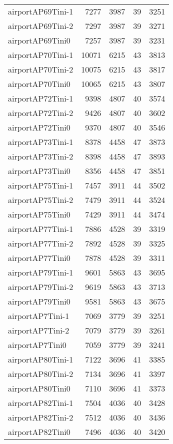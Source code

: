 \begin{longtable}{lrrrr}
airportAP69Tini-1 & 7277 & 3987 & 39 & 3251 \\
airportAP69Tini-2 & 7297 & 3987 & 39 & 3271 \\
airportAP69Tini0 & 7257 & 3987 & 39 & 3231 \\
airportAP70Tini-1 & 10071 & 6215 & 43 & 3813 \\
airportAP70Tini-2 & 10075 & 6215 & 43 & 3817 \\
airportAP70Tini0 & 10065 & 6215 & 43 & 3807 \\
airportAP72Tini-1 & 9398 & 4807 & 40 & 3574 \\
airportAP72Tini-2 & 9426 & 4807 & 40 & 3602 \\
airportAP72Tini0 & 9370 & 4807 & 40 & 3546 \\
airportAP73Tini-1 & 8378 & 4458 & 47 & 3873 \\
airportAP73Tini-2 & 8398 & 4458 & 47 & 3893 \\
airportAP73Tini0 & 8356 & 4458 & 47 & 3851 \\
airportAP75Tini-1 & 7457 & 3911 & 44 & 3502 \\
airportAP75Tini-2 & 7479 & 3911 & 44 & 3524 \\
airportAP75Tini0 & 7429 & 3911 & 44 & 3474 \\
airportAP77Tini-1 & 7886 & 4528 & 39 & 3319 \\
airportAP77Tini-2 & 7892 & 4528 & 39 & 3325 \\
airportAP77Tini0 & 7878 & 4528 & 39 & 3311 \\
airportAP79Tini-1 & 9601 & 5863 & 43 & 3695 \\
airportAP79Tini-2 & 9619 & 5863 & 43 & 3713 \\
airportAP79Tini0 & 9581 & 5863 & 43 & 3675 \\
airportAP7Tini-1 & 7069 & 3779 & 39 & 3251 \\
airportAP7Tini-2 & 7079 & 3779 & 39 & 3261 \\
airportAP7Tini0 & 7059 & 3779 & 39 & 3241 \\
airportAP80Tini-1 & 7122 & 3696 & 41 & 3385 \\
airportAP80Tini-2 & 7134 & 3696 & 41 & 3397 \\
airportAP80Tini0 & 7110 & 3696 & 41 & 3373 \\
airportAP82Tini-1 & 7504 & 4036 & 40 & 3428 \\
airportAP82Tini-2 & 7512 & 4036 & 40 & 3436 \\
airportAP82Tini0 & 7496 & 4036 & 40 & 3420 \\

\end{longtable}
